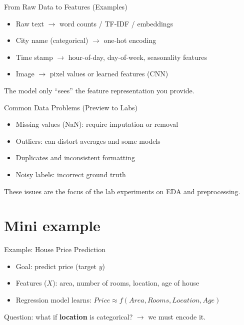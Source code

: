 \documentclass[aspectratio=169]{beamer}
\begin{document}
\begin{frame}{From Raw Data to Features (Examples)}
  \begin{itemize}[<+->]
    \item Raw text $\rightarrow$ word counts / TF-IDF / embeddings
    \item City name (categorical) $\rightarrow$ one-hot encoding
    \item Time stamp $\rightarrow$ hour-of-day, day-of-week, seasonality features
    \item Image $\rightarrow$ pixel values or learned features (CNN)
  \end{itemize}
  \vspace{0.3em}
  \small The model only ``sees'' the feature representation you provide.
\end{frame}

\begin{frame}{Common Data Problems (Preview to Labs)}
  \begin{itemize}[<+->]
    \item Missing values (NaN): require imputation or removal
    \item Outliers: can distort averages and some models
    \item Duplicates and inconsistent formatting
    \item Noisy labels: incorrect ground truth
  \end{itemize}
  \vspace{0.4em}
  These issues are the focus of the lab experiments on EDA and preprocessing.
\end{frame}

\section{Mini example}
\label{sec:example}

\begin{frame}{Example: House Price Prediction}
  \begin{itemize}[<+->]
    \item Goal: predict price (target $y$)
    \item Features ($X$): area, number of rooms, location, age of house
    \item Regression model learns: $Price \approx f(Area, Rooms, Location, Age)$
  \end{itemize}
  \vspace{0.4em}
  Question: what if \textbf{location} is categorical? $\rightarrow$ we must encode it.
\end{frame}
\end{document}
